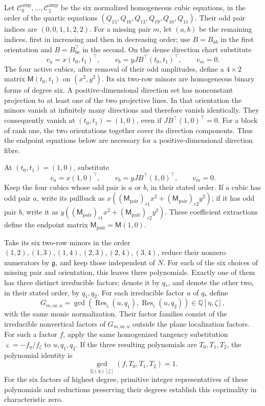 \documentclass[11pt,a4paper]{article}
\numberwithin{equation}{section}
\theoremstyle{plain}
\theoremstyle{definition}
\theoremstyle{remark}
\begin{document}
Let $\mathcal C_0^{\mathrm{amp}},\ldots,\mathcal C_5^{\mathrm{amp}}$ be the six normalized homogeneous cubic equations,
in the order of the quartic equations
$(Q_{15},Q_{18},Q_{13},Q_{19},Q_{10},Q_{11})$. Their odd pair indices are
$(0,0,1,1,2,2)$. For a missing pair $m$, let $(a,b)$ be the
remaining indices, first in increasing and then in decreasing order;
use $B=B_{ab}$ in the first orientation and $B=B_{ba}^{\top}$ in the
second. On the dense direction chart substitute
\[
 v_a=x(t_0,t_1)^{\top},\qquad
 v_b=yJB^{\top}(t_0,t_1)^{\top},\qquad v_m=0.
\]
The four active cubics, after removal of their odd amplitudes, define a
$4\times2$ matrix $\mathsf M(t_0,t_1)$ on $(x^2,y^2)$. Its six two-row
minors are homogeneous binary forms of degree six. A positive-dimensional
direction set has nonconstant projection to at least one of the two
projective lines. In that orientation the minors vanish at infinitely
many directions and therefore vanish identically. They consequently
vanish at $(t_0,t_1)=(1,0)$, even if $JB^{\top}(1,0)^{\top}=0$.
For a block of rank one, the two orientations together cover its
direction components. Thus the endpoint equations below
are necessary for a positive-dimensional direction fibre.

At $(t_0,t_1)=(1,0)$, substitute
\[
 v_a=x(1,0)^{\top},\qquad v_b=yJB^{\top}(1,0)^{\top},\qquad v_m=0.
\]
Keep the four cubics whose odd pair is $a$ or $b$, in their stated
order. If a cubic has odd pair $a$, write its pullback as
$x((\mathsf M_{\mathrm{pair}})_{r1}x^2+(\mathsf M_{\mathrm{pair}})_{r2}y^2)$; if it has odd pair $b$, write it as
$y((\mathsf M_{\mathrm{pair}})_{r1}x^2+(\mathsf M_{\mathrm{pair}})_{r2}y^2)$. These coefficient extractions define the
endpoint matrix $\mathsf M_{\mathrm{pair}}=\mathsf M(1,0)$.

Take its six two-row minors in the order
$(1,2),(1,3),(1,4),(2,3),(2,4),(3,4)$, reduce their nonzero
numerators by $\mathfrak g$, and keep those independent of $N$.
For each of the six choices of missing pair and orientation, this
leaves three polynomials. Exactly one of them has three distinct
irreducible factors; denote it by $q_*$, and denote the other two,
in their stated order, by $q_1,q_2$. For each irreducible factor
$u$ of $q_*$ define
\[
 G_{m,\mathrm{or},u}
 =\gcd\left(\operatorname{Res}_{\varsigma}(u,q_1),
             \operatorname{Res}_{\varsigma}(u,q_2)\right)
             \in\mathbb Q[\eta,\zeta],
\]
with the same monic normalization. Their factor families consist of the irreducible
nonvertical factors of $G_{m,\mathrm{or},u}$ outside the plane
localization factors. 
For such a factor $f$, apply the same homogenized tangency substitution
$\varsigma=-f_\eta/f_\zeta$ to $u,q_1,q_2$. If the three resulting
polynomials are $T_0,T_1,T_2$, the polynomial identity is
\[
 \gcd_{\mathbb Q(\eta)[\zeta]}(f,T_0,T_1,T_2)=1.
\]
For the six factors of highest degree, primitive integer representatives
of these polynomials and reductions preserving their degrees
establish this coprimality in characteristic zero.
\end{document}
